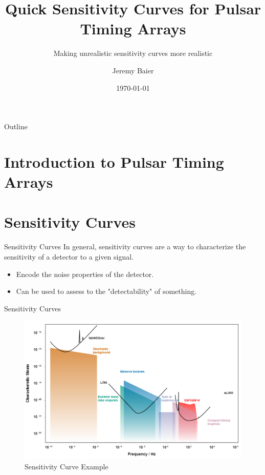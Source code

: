 \documentclass{beamer}
\title[PTA Sensitivity]{Quick Sensitivity Curves for Pulsar Timing Arrays}
\subtitle{Making unrealistic sensitivity curves more realistic}
\author[Jeremy Baier]{Jeremy Baier}
\institute[OSU]{Oregon State University}
\date{\today}
\begin{document}
\begin{frame}
    \titlepage
\end{frame}

\begin{frame}{Outline}
    \tableofcontents
\end{frame}

\section{Introduction to Pulsar Timing Arrays}





\section{Sensitivity Curves}
\begin{frame}{Sensitivity Curves}
    In general, sensitivity curves are a way to characterize the sensitivity of a detector to a given signal.
    \begin{itemize}
        \item Encode the noise properties of the detector.
        \item Can be used to assess to the "detectability" of something.
    \end{itemize}
\end{frame}

\begin{frame}{Sensitivity Curves}
    \begin{figure}
        \centering
        \includegraphics[width=\linewidth]{figs/my_gwplotter.png}
        \caption{Sensitivity Curve Example}
        \label{fig:sensitivity_curve}
    \end{figure}
\end{frame}
\end{document}
